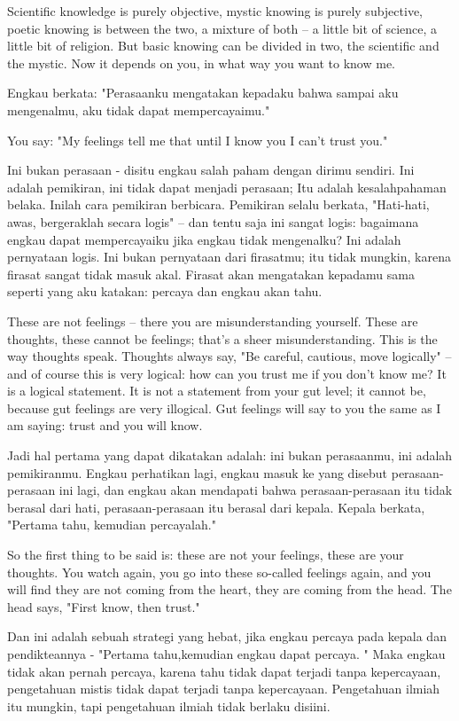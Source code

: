 \english
Scientific knowledge is purely objective, mystic knowing is purely subjective, poetic knowing is between the two, a mixture of both -- a little bit of science, a little bit of religion. But basic knowing can be divided in two, the scientific and the mystic. Now it depends on you, in what way you want to know me.

\bahasa
Engkau berkata: "Perasaanku mengatakan kepadaku bahwa sampai aku mengenalmu, aku tidak dapat mempercayaimu."

\english
You say: "My feelings tell me that until I know you I can't trust you."

\bahasa
Ini bukan perasaan - disitu engkau salah paham dengan dirimu sendiri. Ini adalah pemikiran, ini tidak dapat menjadi perasaan; Itu adalah kesalahpahaman belaka. Inilah cara pemikiran berbicara. Pemikiran selalu berkata, "Hati-hati, awas, bergeraklah secara logis" -- dan tentu saja ini sangat logis: bagaimana engkau dapat mempercayaiku jika engkau tidak mengenalku? Ini adalah pernyataan logis. Ini bukan pernyataan dari firasatmu; itu tidak mungkin, karena firasat sangat tidak masuk akal. Firasat akan mengatakan kepadamu sama seperti yang aku katakan: percaya dan engkau akan tahu.

\english
These are not feelings -- there you are misunderstanding yourself. These are thoughts, these cannot be feelings; that's a sheer misunderstanding. This is the way thoughts speak. Thoughts always say, "Be careful, cautious, move logically" -- and of course this is very logical: how can you trust me if you don't know me? It is a logical statement. It is not a statement from your gut level; it cannot be, because gut feelings are very illogical. Gut feelings will say to you the same as I am saying: trust and you will know.

\bahasa
Jadi hal pertama yang dapat dikatakan adalah: ini bukan perasaanmu, ini adalah pemikiranmu. Engkau perhatikan lagi, engkau masuk ke yang disebut perasaan-perasaan ini lagi, dan engkau akan mendapati bahwa perasaan-perasaan itu tidak berasal dari hati, perasaan-perasaan itu berasal dari kepala. Kepala berkata, "Pertama tahu, kemudian percayalah."

\english
So the first thing to be said is: these are not your feelings, these are your thoughts. You watch again, you go into these so-called feelings again, and you will find they are not coming from the heart, they are coming from the head. The head says, "First know, then trust."

\bahasa
Dan ini adalah sebuah strategi yang hebat, jika engkau percaya pada kepala dan pendikteannya - "Pertama tahu,kemudian engkau dapat percaya. " Maka engkau tidak akan pernah percaya, karena tahu tidak dapat terjadi tanpa kepercayaan, pengetahuan mistis tidak dapat terjadi tanpa kepercayaan. Pengetahuan ilmiah itu mungkin, tapi pengetahuan ilmiah tidak berlaku disiini.

